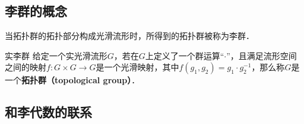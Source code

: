 

\subsection{李群的概念}

当拓扑群的拓扑部分构成光滑流形时，所得到的拓扑群被称为李群．

\begin{definition}{实李群}
给定一个实光滑流形$G$，若在$G$上定义了一个群运算“$\cdot$”，且满足流形空间之间的映射$f:G\times G\rightarrow G$是一个光滑映射，其中$f(g_1, g_2)=g_1\cdot g_2^{-1}$，那么称$G$是一个\textbf{拓扑群（topological group）}．
\end{definition}




\subsection{和李代数的联系}



